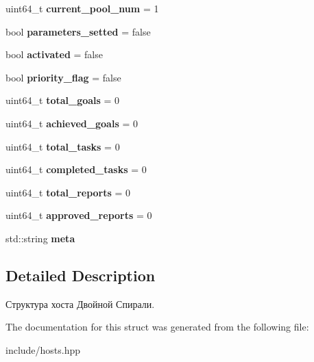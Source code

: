 \begin{DoxyCompactItemize}
\item 
\mbox{\label{structhosts_a703c5a487e62f539ada0d0919c6d4d8a}} 
uint64\+\_\+t {\bfseries current\+\_\+pool\+\_\+num} = 1
\item 
\mbox{\label{structhosts_a0477b593cb8d61af22ce82412f4fed2b}} 
bool {\bfseries parameters\+\_\+setted} = false
\item 
\mbox{\label{structhosts_ab614f55d27e39c67fef74656c9b9ef6d}} 
bool {\bfseries activated} = false
\item 
\mbox{\label{structhosts_a9ccdcc8e52f110b73bfe268c2974a4de}} 
bool {\bfseries priority\+\_\+flag} = false
\item 
\mbox{\label{structhosts_ad07e72527df764f0f8af057383e70779}} 
uint64\+\_\+t {\bfseries total\+\_\+goals} = 0
\item 
\mbox{\label{structhosts_adbea0c2fde59423cbcca98fe36f560d3}} 
uint64\+\_\+t {\bfseries achieved\+\_\+goals} = 0
\item 
\mbox{\label{structhosts_a6e0bb8abc121c4713d0fed50bc6dde0b}} 
uint64\+\_\+t {\bfseries total\+\_\+tasks} = 0
\item 
\mbox{\label{structhosts_ab4622f3ad8104be5680d5241244b0592}} 
uint64\+\_\+t {\bfseries completed\+\_\+tasks} = 0
\item 
\mbox{\label{structhosts_a3aea471591de79d52ef50ff662ee3cab}} 
uint64\+\_\+t {\bfseries total\+\_\+reports} = 0
\item 
\mbox{\label{structhosts_aba324f4fd3d8c36615e66cf74d3b6729}} 
uint64\+\_\+t {\bfseries approved\+\_\+reports} = 0
\item 
\mbox{\label{structhosts_a5c7cc5c65f7e7c4f6eaebf34fbb83c2e}} 
std\+::string {\bfseries meta}
\end{DoxyCompactItemize}


\subsection{Detailed Description}
Структура хоста Двойной Спирали. 

The documentation for this struct was generated from the following file\+:\begin{DoxyCompactItemize}
\item 
include/hosts.\+hpp\end{DoxyCompactItemize}

